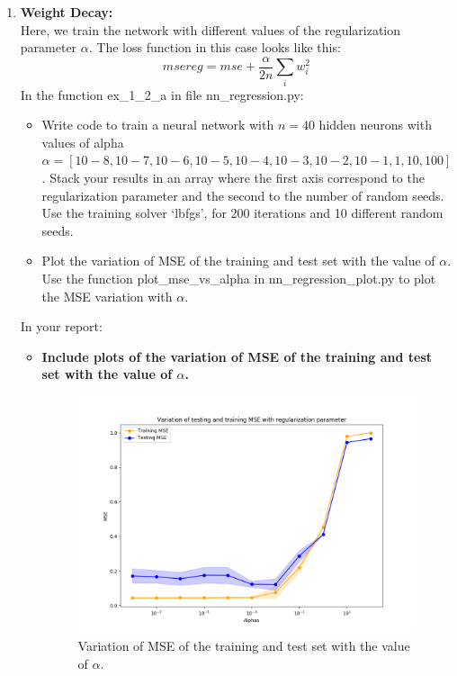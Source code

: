 \documentclass[a4paper]{article}
\begin{document}
\begin{enumerate}[label=(\alph*)]
	\item \textbf{Weight Decay:}\\
    Here, we train the network with different values of the regularization parameter $\alpha$. The loss function in this case looks like this:
    \[
    	msereg = mse + \frac{\alpha}{2n}\sum_i w_i^2
    \]
    In the function ex\_1\_2\_a in file nn\_regression.py:
    \begin{itemize}
        \item Write code to train a neural network with $n = 40$ hidden neurons with values of alpha $\alpha = [10−8, 10−7, 10−6, 10−5, 10−4, 10−3, 10−2, 10−1, 1, 10, 100]$. Stack your results in an array where the first axis correspond to the regularization parameter and the second to the number of random seeds. Use the training solver ‘lbfgs’, for 200 iterations and 10 different random seeds.
        \item Plot the variation of MSE of the training and test set with the value of $\alpha$. Use the function plot\_mse\_vs\_alpha in nn\_regression\_plot.py to plot the MSE variation with $\alpha$.
    \end{itemize}
In your report:
\begin{itemize}
\item \textbf{Include plots of the variation of MSE of the training and test set with the value of $\alpha$.}

\begin{figure}[htp]
  \centering
  \includegraphics[scale=0.50]{plots/12a.png}        \caption{Variation of MSE of the training and test set with the value of $\alpha$.}
  \label{fig:12a}
\end{figure}


\end{itemize}
\end{enumerate}
\end{document}
